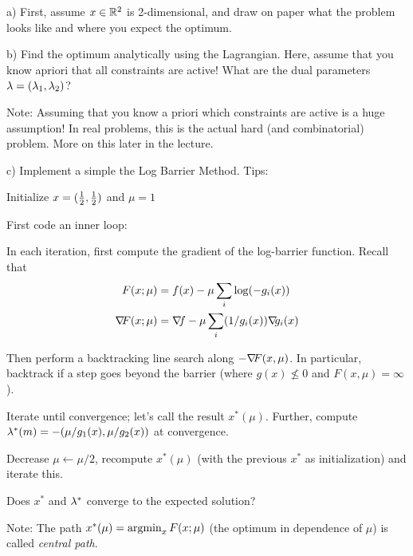 a) First, assume $x\in{\mathbb{R}}^2$ is 2-dimensional, and
draw on paper what the problem looks like and where you expect the
optimum.

b) Find the optimum analytically using the Lagrangian. Here, assume
that you know apriori that all constraints are active! What are the
dual parameters $\lambda=(\lambda_1,\lambda_2)$?

Note: Assuming that you know a priori which constraints are active is
a huge assumption! In real problems, this is the actual hard (and
combinatorial) problem. More on this later in the lecture.


c) Implement a simple the Log Barrier Method. Tips:
\begin{items}
\item Initialize $x=(\frac{1}{2},\frac{1}{2})$ and $\mu=1$
\item First code an inner loop:
\begin{items}
\item In each iteration, first compute the gradient of the log-barrier
function. Recall that
\begin{align}
F(x;\mu)
 &= f(x) - \mu \sum_i \log(-g_i(x)) \\
{\nabla_{\!\!}} F(x;\mu)
 &= {\nabla_{\!\!}} f - \mu \sum_i (1/g_i(x)) {\nabla_{\!\!}} g_i(x)
\end{align}
\item Then perform a backtracking line search along $-{\nabla_{\!\!}} F(x,\mu)$. In particular, backtrack if a step goes beyond the barrier (where $g(x)\not\le 0$ and $F(x,\mu)=\infty$).
\item Iterate until convergence; let's call the result
$x^*(\mu)$. Further, compute $\lambda^*(m) = -(\mu/g_1(x), \mu/g_2(x))$ at convergence.
\end{items}
\item Decrease $\mu \gets \mu/2$, recompute $x^*(\mu)$ (with the
previous $x^*$ as initialization) and iterate this.
\end{items}
Does $x^*$ and $\lambda^*$ converge to the expected solution?

Note: The path $x^*(\mu) = \operatorname*{argmin}_x F(x;\mu)$ (the optimum in dependence of $\mu$) is called \emph{central path}.


\exerfoot
